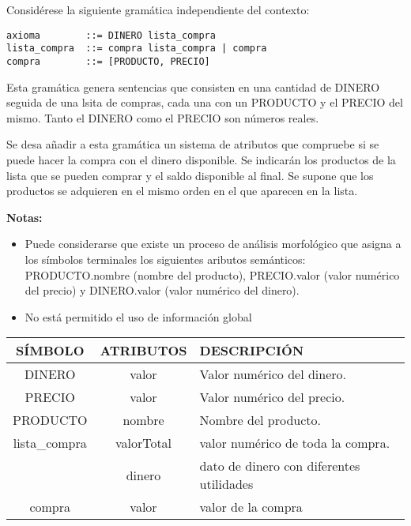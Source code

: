 \documentclass[nochap]{apuntes}
\begin{document}
\begin{problem}
Considérese la siguiente gramática independiente del contexto:
\begin{verbatim}
axioma        ::= DINERO lista_compra
lista_compra  ::= compra lista_compra | compra
compra        ::= [PRODUCTO, PRECIO]
\end{verbatim}
Esta gramática genera sentencias que consisten en una cantidad de DINERO seguida de una lsita de compras, cada una con un PRODUCTO y el PRECIO del mismo. Tanto el DINERO como el PRECIO son números reales.

Se desa añadir a esta gramática un sistema de atributos que compruebe si se puede hacer la compra con el dinero disponible. Se indicarán los productos de la lista que se pueden comprar y el saldo disponible al final. Se supone que los productos se adquieren en el mismo orden en el que aparecen en la lista.

\textbf{Notas:}
\begin{itemize}
\item Puede considerarse que existe un proceso de análisis morfológico que asigna a los símbolos terminales los siguientes aributos semánticos: PRODUCTO.nombre (nombre del producto), PRECIO.valor (valor numérico del precio) y DINERO.valor (valor numérico del dinero).
\item No está permitido el uso de información global
\end{itemize}
\solution

\begin{tabular}{|c|c|l|}
\hline
SÍMBOLO & ATRIBUTOS & DESCRIPCIÓN \\
\hline
\hline
DINERO & valor & Valor numérico del dinero. \\
\hline
PRECIO & valor & Valor numérico del precio. \\
\hline
PRODUCTO & nombre & Nombre del producto. \\
\hline
 lista\_compra & valorTotal & valor numérico de toda la compra. \\
 \cline{2-3}
  & dinero & dato de dinero con diferentes utilidades  \\
\hline
compra & valor & valor de la compra \\

\hline
\end{tabular}


\end{problem}
\end{document}
